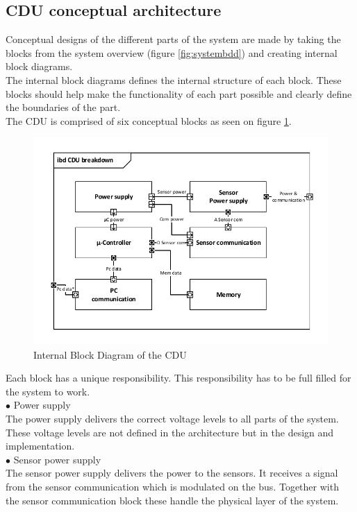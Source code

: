 \subsection{CDU conceptual architecture}
Conceptual designs of the different parts of the system are made by taking the blocks from the system overview (figure \ref{fig:systembdd}) and creating internal block diagrams.\\
The internal block diagrams defines the internal structure of each block. These blocks should help make the functionality of each part possible and clearly define the boundaries of the part.\\
The CDU is comprised of six conceptual blocks as seen on figure \ref{CDU_IBD}. 
\begin{figure}[H]
	\centering
	\includegraphics[width=.8\textwidth]{billeder/11ProjectDescription/CDU_IBD}
	\caption{Internal Block Diagram of the CDU}
	\label{CDU_IBD}
\end{figure}
Each block has a unique responsibility. This responsibility has to be full filled for the system to work.\\
\hspace*{.6cm}$\bullet$ Power supply \\
The power supply delivers the correct voltage levels to all parts of the system. These voltage levels are not defined in the architecture but in the design and implementation.\\
\hspace*{.6cm}$\bullet$ Sensor power supply\\
The sensor power supply delivers the power to the sensors. It receives a signal from the sensor communication which is modulated on the bus. Together with the sensor communication block these handle the physical layer of the system.\\
